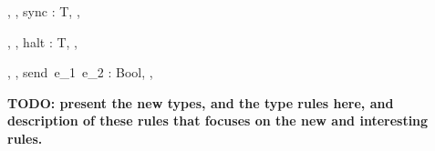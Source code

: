     {\Gamma, \Lambda, \Delta \vdash sync : T, \Lambda, \Delta}
    
    {\Gamma, \Lambda, \Delta \vdash halt : T, \Lambda, \Delta}
    
    {\Gamma, \Lambda, \Delta \vdash send\ e_1\ e_2 : Bool, \Lambda, \Delta}

{\bf TODO: present the new types, and the type rules here, and description of 
these rules that focuses on the new and interesting rules.}

